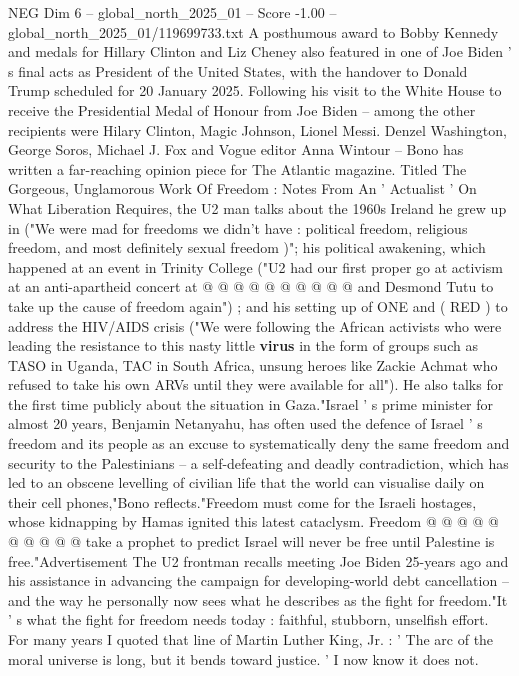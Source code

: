 \begin{textsample}{NEG Dim 6 – global\_north\_2025\_01 – Score -1.00 – global\_north\_2025\_01/119699733.txt}  \label{ex:f6_neg_105}
A posthumous award to Bobby Kennedy and medals for Hillary Clinton and Liz Cheney also featured in one of Joe Biden ' s final acts as President of the United States, with the handover to Donald Trump scheduled for 20 January 2025.
Following his visit to the White House to receive the Presidential Medal of Honour from Joe Biden -- among the other recipients were Hilary Clinton, Magic Johnson, Lionel Messi.
Denzel Washington, George Soros, Michael J.
Fox and Vogue editor Anna Wintour -- Bono has written a far-reaching opinion piece for The Atlantic magazine.
Titled The Gorgeous, Unglamorous Work Of Freedom : Notes From An ' Actualist ' On What Liberation Requires, the U2 man talks about the 1960s Ireland he grew up in ("We were mad for freedoms we didn't have : political freedom, religious freedom, and most definitely sexual freedom )"; his political awakening, which happened at an event in Trinity College ("U2 had our first proper go at activism at an anti-apartheid concert at @ @ @ @ @ @ @ @ @ @ and Desmond Tutu to take up the cause of freedom again") ; and his setting up of ONE and ( RED ) to address the HIV/AIDS crisis ("We were following the African activists who were leading the resistance to this nasty little \textbf{virus} in the form of groups such as TASO in Uganda, TAC in South Africa, unsung heroes like Zackie Achmat who refused to take his own ARVs until they were available for all").
He also talks for the first time publicly about the situation in Gaza."Israel ' s prime minister for almost 20 years, Benjamin Netanyahu, has often used the defence of Israel ' s freedom and its people as an excuse to systematically deny the same freedom and security to the Palestinians -- a self-defeating and deadly contradiction, which has led to an obscene levelling of civilian life that the world can visualise daily on their cell phones,"Bono reflects."Freedom must come for the Israeli hostages, whose kidnapping by Hamas ignited this latest cataclysm.
Freedom @ @ @ @ @ @ @ @ @ @ take a prophet to predict Israel will never be free until Palestine is free."Advertisement The U2 frontman recalls meeting Joe Biden 25-years ago and his assistance in advancing the campaign for developing-world debt cancellation -- and the way he personally now sees what he describes as the fight for freedom."It ' s what the fight for freedom needs today : faithful, stubborn, unselfish effort.
For many years I quoted that line of Martin Luther King, Jr. : ' The arc of the moral universe is long, but it bends toward justice. ' I now know it does not.

\end{textsample}
